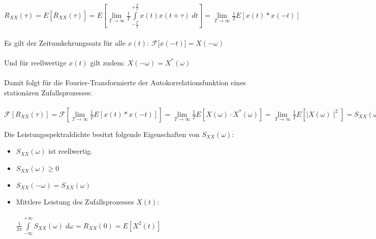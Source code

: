 \documentclass[10pt, a4paper]{article}
\begin{document}
\begin{itemize}
        $R_{XX}(\tau) = E[\overline{R}_{XX}(\tau)]  
                      = E\left[ \lim\limits_{T \rightarrow \infty}
                                  \frac{1}{T} \int\limits_{-\frac{T}{2}}^{+\frac{T}{2}}
                                     x(t)x(t+\tau) \; dt \right] 
                      = \lim\limits_{T \rightarrow \infty}
                                  \frac{1}{T} E\left[ x(t)\ast x(-t) \right] $ \\ \\
        Es gilt der Zeitumkehrungssatz f\"ur alle $x(t)$:
        ${\mathcal F}\lbrack x(-t) \rbrack = X(-\omega)$\\ \\
        Und f\"ur reellwertige $x(t)$ gilt zudem:
        $X(-\omega) = X^{\ast}(\omega)$\\ \\
        Damit folgt f\"ur die Fourier-Transformierte der Autokorrelationsfunktion
        eines station\"aren Zufallsprozesses: \\ \\
        ${\mathcal F} \left[ R_{XX}(\tau)\right] 
          = {\mathcal F} \left[  \lim\limits_{T \rightarrow \infty}
                                  \frac{1}{T} E\left[ x(t)\ast x(-t) \right] \right]  
          = \lim\limits_{T \rightarrow \infty}
              \frac{1}{T} E\left[ X(\omega) \cdot X^{\ast}(\omega) \right]
          = \lim\limits_{T \rightarrow \infty}
              \frac{1}{T} E\left[\mid\! X(\omega) \!\mid^{2} \right]
          = S_{XX}(\omega)$ \\ 


\end{itemize} 
Die Leistungsspektraldichte besitzt folgende Eigenschaften von $S_{XX}(\omega)$:
\begin{itemize}
  \item $S_{XX}(\omega)$ ist reellwertig.
  \item $S_{XX}(\omega) \geq 0$
  \item $S_{XX}(-\omega) = S_{XX}(\omega)$ 
  \item Mittlere Leistung des Zufallsprozesses $X(t)$: \\ \\
        $\frac{1}{2\pi} \int\limits_{-\infty}^{+\infty}
                           S_{XX}(\omega) \; d\omega = R_{XX}(0) = E[X^{2}(t)]$ 
\end{itemize} 
\end{document}
